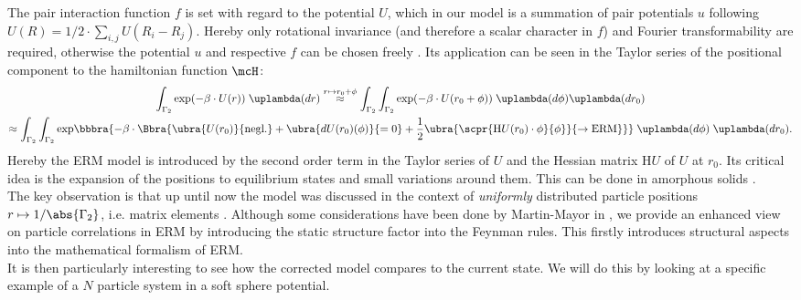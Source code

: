 The pair interaction function $f$ is set with regard to the potential $U$, which in our model is a summation of pair potentials $u$ following $U(R) = 1/2\cdot\sum_{i,j}U(R_i - R_j)$. Hereby only rotational invariance (and therefore a scalar character in $f$) and Fourier transformability are required, otherwise the potential $u$ and respective $f$ can be chosen freely \cite{paper:Grigera_2011}. Its application can be seen in the Taylor series of the positional component to the hamiltonian function $\mcH$:
\begin{multline*}
    \int_{\Gamma_2}\exp(-\beta\cdot U(r))\;\uplambda(dr)\stackrel{r\mapsto r_0 + \phi}{\approx} \int_{\Gamma_2}\int_{\Gamma_2}\exp(-\beta\cdot U(r_0 + \phi))\;\uplambda(d\phi)\uplambda(dr_0) \\
    \approx \int_{\Gamma_2}\int_{\Gamma_2}{\exp}\bbbra{-\beta\cdot \Bbra{
        \ubra{U(r_0)}{\text{negl.}} + \ubra{dU(r_0)(\phi)}{=0} + \frac{1}{2}\ubra{\scpr{\text{H}U(r_0)\cdot\phi}{\phi}}{\to\text{ERM}}
    }}\;\uplambda(d\phi)\;\uplambda(dr_0).
\end{multline*}
Hereby the ERM model is introduced by the second order term in the Taylor series of $U$ and the Hessian matrix $\text{H}U$ of $U$ at $r_0$. Its critical idea is the expansion of the positions to equilibrium states and small variations around them. This can be done in amorphous solids \cite{ALEXANDER199865}. \\

The key observation is that up until now the model was discussed in the context of \emph{uniformly} distributed particle positions $r\mapsto 1/\abs{\Gamma_2}$, i.e. matrix elements \cite{paper:Grigera_2011,mth:vogel}. Although some considerations have been done by Martin-Mayor in \cite{10.1063/1.1349709}, we provide an enhanced view on particle correlations in ERM by introducing the static structure factor into the Feynman rules.
This firstly introduces structural aspects into the mathematical formalism of ERM. \\

It is then particularly interesting to see how the corrected model compares to the current state. We will do this by looking at a specific example of a $N$ particle system in a soft sphere potential. 

